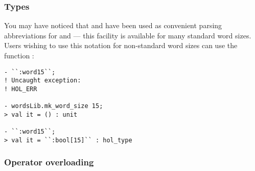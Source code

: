 \subsubsection{Types}

You may have noticed that  and  have been used as convenient parsing abbreviations for \ty{:\bool[4]} and \ty{:\bool[8]} --- this facility is available for many standard word sizes.  Users wishing to use this notation for non-standard word sizes can use the function :
\begin{session}
\begin{verbatim}
- ``:word15``;
! Uncaught exception:
! HOL_ERR

- wordsLib.mk_word_size 15;
> val it = () : unit

- ``:word15``;
> val it = ``:bool[15]`` : hol_type
\end{verbatim}
\end{session}

\subsubsection{Operator overloading}

